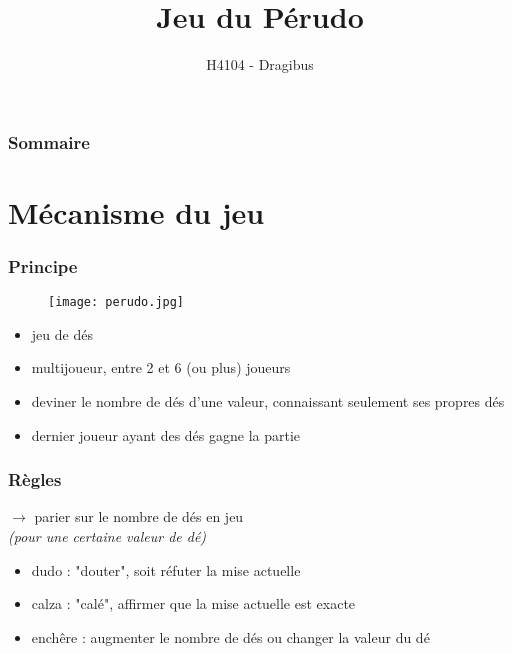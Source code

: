 \documentclass{beamer}
\title{Jeu du Pérudo}
\author{H4104 - Dragibus}
\institute{INSA de Lyon}
\begin{document}
\begin{frame}
  \titlepage
\end{frame}

\begin{frame}
  \frametitle{Sommaire}
  \tableofcontents[hideallsubsections]
\end{frame}

\section{Mécanisme du jeu}

\begin{frame}
  \frametitle{Principe}

  \begin{figure}
    \texttt{[image: perudo.jpg]}
  \end{figure}

  \begin{itemize}
    \item jeu de dés
    \item multijoueur, entre 2 et 6 (ou plus) joueurs
    \item deviner le nombre de dés d'une valeur, connaissant seulement ses
      propres dés
    \item dernier joueur ayant des dés gagne la partie
  \end{itemize}
\end{frame}

\begin{frame}
  \frametitle{Règles}
  $\to$ parier sur le nombre de dés en jeu \\
  \emph{(pour une certaine valeur de dé)}

  \begin{itemize}
    \item dudo : "douter", soit réfuter la mise actuelle
    \item calza : "calé", affirmer que la mise actuelle est exacte
    \item enchêre : augmenter le nombre de dés ou changer la valeur du dé
  \end{itemize}

  \\[5mm]
\end{frame}
\end{document}
